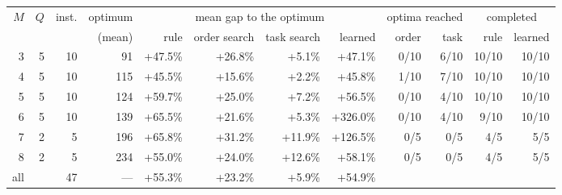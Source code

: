 \begin{tabular}{rrrrrrrrrrrr}
\toprule
$M$ & $Q$ & inst. & optimum & \multicolumn{4}{c}{mean gap to the optimum} & \multicolumn{2}{c}{optima reached} & \multicolumn{2}{c}{completed} \\
\cmidrule(lr){5-8}\cmidrule(lr){9-10}\cmidrule(lr){11-12}
& & & (mean) & rule & order search & task search & learned & order & task & rule & learned \\
\midrule
3 & 5 & 10 & 91 & +47.5\% & +26.8\% & +5.1\% & +47.1\% & 0/10 & 6/10 & 10/10 & 10/10 \\
4 & 5 & 10 & 115 & +45.5\% & +15.6\% & +2.2\% & +45.8\% & 1/10 & 7/10 & 10/10 & 10/10 \\
5 & 5 & 10 & 124 & +59.7\% & +25.0\% & +7.2\% & +56.5\% & 0/10 & 4/10 & 10/10 & 10/10 \\
6 & 5 & 10 & 139 & +65.5\% & +21.6\% & +5.3\% & +326.0\% & 0/10 & 4/10 & 9/10 & 10/10 \\
7 & 2 & 5 & 196 & +65.8\% & +31.2\% & +11.9\% & +126.5\% & 0/5 & 0/5 & 4/5 & 5/5 \\
8 & 2 & 5 & 234 & +55.0\% & +24.0\% & +12.6\% & +58.1\% & 0/5 & 0/5 & 4/5 & 5/5 \\
\midrule
all & & 47 & --- & +55.3\% & +23.2\% & +5.9\% & +54.9\% & & & & \\
\bottomrule
\end{tabular}%

